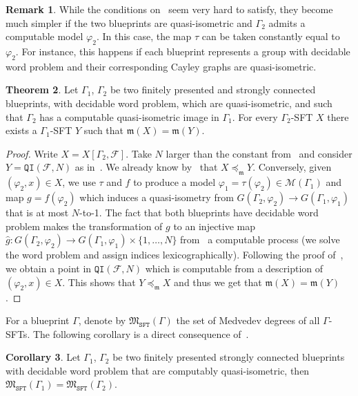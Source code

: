 \documentclass{article}
\theoremstyle{definition}
\newtheorem{theorem}{Theorem}[section] %
\newtheorem{corollary}[theorem]{Corollary}
\newtheorem{remark}[theorem]{Remark}
\theoremstyle{definition}
\newcommand{\FF}{\mathcal{F}}
\newcommand{\QI}{\mathtt{QI}}
\begin{document}
    \begin{remark}
        While the conditions on~ seem very hard to satisfy, they become much simpler if the two blueprints are quasi-isometric and $\Gamma_2$ admits a computable model $\varphi_2$. In this case, the map $\tau$ can be taken constantly equal to $\varphi_2$. For instance, this happens if each blueprint represents a group with decidable word problem and their corresponding Cayley graphs are quasi-isometric.
    \end{remark}

\begin{theorem}\label{thm:medvedev_full}
    Let $\Gamma_1$, $\Gamma_2$ be two finitely presented and strongly connected blueprints, with decidable word problem, which are quasi-isometric, and such that $\Gamma_2$ has a computable quasi-isometric image in $\Gamma_1$. For every $\Gamma_2$-SFT $X$ there exists a $\Gamma_1$-SFT $Y$ such that $\mathfrak{m}(X)=\mathfrak{m}(Y)$.
\end{theorem}

\begin{proof}
    Write $X=X[\Gamma_2,\FF]$. Take $N$ larger than the constant from~ and consider $Y = \QI(\FF,N)$ as in~. We already know by~ that $X \preceq_{\mathfrak{m}} Y$. Conversely, given $(\varphi_2,x)\in X$, we use $\tau$ and $f$ to produce a model $\varphi_1 = \tau(\varphi_2) \in \mathcal{M}(\Gamma_1)$ and map $g=f(\varphi_2)$ which induces a quasi-isometry from $G(\Gamma_2,\varphi_2) \to G(\Gamma_1,\varphi_1)$ that is at most $N$-to-1. The fact that both blueprints have decidable word problem makes the transformation of $g$ to an injective map $\widehat{g}\colon G(\Gamma_2,\varphi_2) \to G(\Gamma_1,\varphi_1) \times \{1,\dots, N\}$ from~ a computable process (we solve the word problem and assign indices lexicographically). Following the proof of~, we obtain a point in $\QI(\FF,N)$ which is computable from a description of $(\varphi_2,x)\in X$. This shows that $Y \preceq_{\mathfrak{m}} X$ and thus we get that $\mathfrak{m}(X)=\mathfrak{m}(Y)$.
\end{proof}

For a blueprint $\Gamma$, denote by $\mathfrak{M}_{\texttt{SFT}}(\Gamma)$ the set of Medvedev degrees of all $\Gamma$-SFTs. The following corollary is a direct consequence of~.

\begin{corollary}
    Let $\Gamma_1$, $\Gamma_2$ be two finitely presented strongly connected blueprints with decidable word problem that are computably quasi-isometric, then $\mathfrak{M}_{\texttt{SFT}}(\Gamma_1)=\mathfrak{M}_{\texttt{SFT}}(\Gamma_2)$.
\end{corollary}
\end{document}
